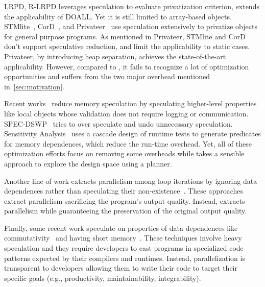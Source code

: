 LRPD\cite{rauchwerger:99:pds}, R-LRPD\cite{dang:02:ipdps} leverages
speculation to evaluate privatization criterion, extends the applicability
of DOALL. Yet it is still limited to array-based objects.
STMlite~\cite{mehrara:09:stmlite}, CorD~\cite{tian:10:pldi}, and
Privateer~\cite{johnson:12:pldi} use speculation extensively to privatize
objects for general purpose programs. As mentioned in Privateer, STMlite
and CorD don't support speculative reduction, and limit the applicability
to static cases. Privateer, by introducing heap separation, achieves the
state-of-the-art applicability. However, compared to \namensp, it fails to
recognize a lot of optimization opportunities and suffers from the two
major overhead mentioned in~\cref{sec:motivation}.

Recent works~\cite{ctian:2008:micro,johnson:12:pldi,kim:12:cgo} reduce
memory speculation by speculating higher-level properties like local
objects whose validation does not require logging or communication.
SPEC-DSWP~\cite{vachharajani:07:pact} tries to over speculate and undo
unnecessary speculation. Sensitivity Analysis~\cite{Rus:07:ics} uses a
cascade design of runtime tests to generate predicates for memory
dependences, which reduce the run-time overhead. Yet, all of these
optimization efforts focus on removing some overheads while \namensp takes
a sensible approach to explore the design space using a planner.

Another line of work extracts parallelism among loop iterations by ignoring
data dependences rather than speculating their
non-existence~\cite{campanoni:2015:cgo,Udupa:2011:AEB:1993498.1993555,misailovic2013parallelizing}.
These approaches extract parallelism sacrificing the program's output
quality. Instead, \name extracts parallelism while guaranteeing the
preservation of the original output quality.

Finally, some recent work speculate on properties of data dependences like
commutativity~\cite{kulkarni:07:pldi,Nguyen:2014:DGO:2541940.2541964} and
having short memory~\cite{Deiana:2018:UPN:3173162.3173181}. These
techniques involve heavy speculation and they require developers to cast
programs in specialized code patterns expected by their compilers and
runtimes. Instead, \name parallelization is transparent to developers
allowing them to write their code to target their specific goals (e.g.,
productivity, maintainability, integrability).



